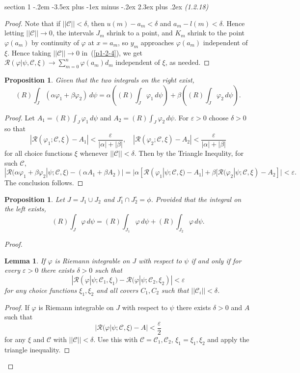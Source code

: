 \documentclass[12pt]{article}
\makeatletter
\theoremstyle{norm}
\newtheorem{lem}[thm]{Lemma}
\newtheorem{pr}[thm]{Proposition}
\providecommand{\cal}[1]{\mathcal{#1}}
\renewcommand{\cal}[1]{\mathcal{#1}}
\newcommand{\al}[0]{\alpha}
\newcommand{\be}[0]{\beta}
\newcommand{\de}[0]{\delta}
\newcommand{\ep}[0]{\varepsilon}
\newcommand{\eph}[0]{\frac{\varepsilon}{2}}
\newcommand{\ph}[0]{\varphi}
\newcommand{\pa}[1]{\left( {#1} \right)}
\newenvironment{problem}{\@startsection
       {section}
       {1}
       {-.2em}
       {-3.5ex plus -1ex minus -.2ex}
       {2.3ex plus .2ex}
       {\pagebreak[3]%
       \large\bf\noindent{Problem }
       }
       }
       {%
       }
\makeatother
\begin{document}
\begin{problem}{\it (1.2.18)}
\begin{proof}
Note that if $||\mathcal C||<\delta$, then $u(m)-a_m<\de$ and $a_m-l(m)<\de$. Hence 
letting $||\mathcal C||\to 0$, the intervals $J_m$ shrink to a point, and $K_m$ shrink to the point $\ph(a_m)$ by continuity of $\ph$ at $x=a_m$, so $y_m$ approaches $\ph(a_m)$ independent of $\xi$. Hence taking $||\mathcal C||\to 0$ in~(\ref{p1-2-4}), we get $\mathcal R(\ph|\psi, \mathcal C, \xi)\to \sum_{m=0}^{n} \ph(a_m)d_m$ independent of $\xi$, as needed.
\end{proof}
\begin{pr}
Given that the two integrals on the right exist,
\[
(R)\int_J (\al \ph_1+\be \ph_2)\,d\psi=
\al \pa{(R)\int_J \ph_1\,d\psi}+\be \pa{(R)\int_J\ph_2\,d\psi}.
\]
\end{pr}
\begin{proof}
Let $A_1=(R)\int_J \ph_1\,d\psi$ and $A_2=(R)\int_J \ph_2\,d\psi$. 
For $\ep>0$ choose $\de>0$ so that 
\[|\cal R(\ph_1;\mathcal C,\xi)-A_1|<\frac{\ep}{|\al|+|\be|},\quad
|\cal R(\ph_2;\mathcal C,\xi)-A_2|<\frac{\ep}{|\al|+|\be|}\]
for all choice functions $\xi$ whenever $||\mathcal C||<\de$. Then by the Triangle Inequlity, for such $\mathcal C$,
\[
|\cal R(\al \ph_1+\be\ph_2|\psi;\mathcal C,\xi)-(\al A_1+\be A_2)|
=
|\al [\cal R(\ph_1|\psi;\mathcal C,\xi)-A_1]+\be [\cal R(\ph_2|\psi;\mathcal C,\xi)-A_2]|< \ep.
\]
The conclusion follows.
\end{proof}
\begin{pr}
Let $J=J_1\cup J_2$ and $J_1^{\circ}\cap J_2^{\circ}=\phi$. Provided that the integral on the left exists,
\[
(R)\int_J \ph\,d\psi=(R)\int_{J_1} \ph\,d\psi+(R)\int_{J_2}\ph\,d\psi.
\]
\end{pr}
\begin{proof}
\begin{lem}\label{p1-l1}
If $\ph$ is Riemann integrable on $J$ with respect to $\psi$ if and only if 
for every $\ep>0$ there exists $\de>0$ such that 
\[
|\cal R(\ph|\psi; \mathcal C_1, \xi_1)-\cal R(\ph|\psi; \mathcal C_2, \xi_2)|<\ep
\]
for any choice functions $\xi_1,\xi_2$ and all covers $C_1,C_2$ such that $||\mathcal C_i||<\delta$.
\end{lem}
\begin{proof}
If $\ph$ is Riemann integrable on $J$ with respect to $\psi$ there exists $\de>0$ and $A$ such that 
\[
|\cal R(\ph|\psi; \mathcal C, \xi)-A|<\eph
\]
for any $\xi$ and $\cal C$ with $||\mathcal C||<\delta$. Use this with $\cal C=\cal C_1,\cal C_2$, $\xi_1=\xi_1,\xi_2$ and apply the triangle inequality.


\end{proof}
\end{proof}
\end{problem}
\end{document}
